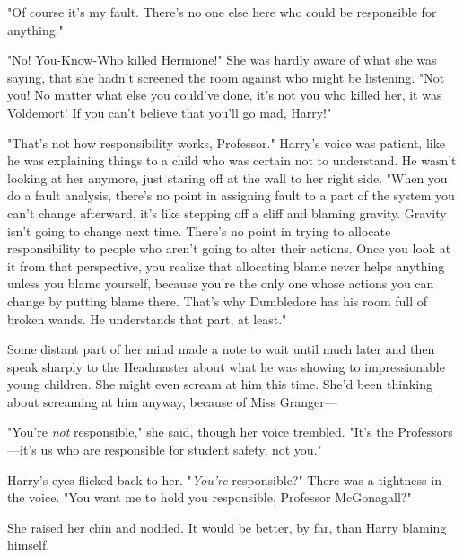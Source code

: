 "Of course it's my fault. There's no one else here who could be responsible for 
anything."

"No! You-Know-Who killed Hermione!" She was hardly aware of what she was 
saying, that she hadn't screened the room against who might be listening. "Not 
you! No matter what else you could've done, it's not you who killed her, it was 
Voldemort! If you can't believe that you'll go mad, Harry!"

"That's not how responsibility works, Professor." Harry's voice was patient, 
like he was explaining things to a child who was certain not to understand. He 
wasn't looking at her anymore, just staring off at the wall to her right side. 
"When you do a fault analysis, there's no point in assigning fault to a part of 
the system you can't change afterward, it's like stepping off a cliff and 
blaming gravity. Gravity isn't going to change next time. There's no point in 
trying to allocate responsibility to people who aren't going to alter their 
actions. Once you look at it from that perspective, you realize that allocating 
blame never helps anything unless you blame yourself, because you're the only 
one whose actions you can change by putting blame there. That's why Dumbledore 
has his room full of broken wands. He understands that part, at least."

Some distant part of her mind made a note to wait until much later and then 
speak sharply to the Headmaster about what he was showing to impressionable 
young children. She might even scream at him this time. She'd been thinking 
about screaming at him anyway, because of Miss Granger---

"You're \emph{not} responsible," she said, though her voice trembled. "It's the 
Professors---it's us who are responsible for student safety, not you."

Harry's eyes flicked back to her. "\emph{You're} responsible?" There was a 
tightness in the voice. "You want me to hold you responsible, Professor 
McGonagall?"

She raised her chin and nodded. It would be better, by far, than Harry blaming 
himself.

